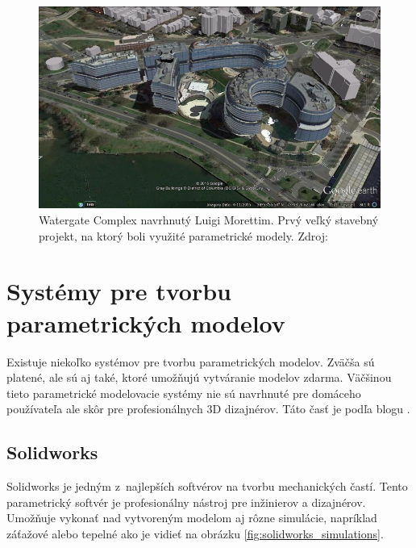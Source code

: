 \begin{figure}[H]
    \centering
    \includegraphics[width = \linewidth]{obrazky-figures/watergate-complex.jpg}
    \caption{Watergate Complex navrhnutý Luigi Morettim. Prvý veľký stavebný projekt, na ktorý boli využité parametrické modely. Zdroj: \cite{munger_2015}}
    \label{fig:Watergate}
\end{figure}





\section{Systémy pre tvorbu parametrických modelov}
Existuje niekoľko systémov pre tvorbu parametrických modelov. Zväčša sú platené, ale sú aj také, ktoré umožňujú vytváranie modelov zdarma. Väčšinou tieto parametrické modelovacie systémy nie sú navrhnuté pre domáceho používateľa ale skôr pre profesionálnych 3D dizajnérov. Táto časť je podľa blogu \cite{gaget_2018}.


\subsection*{Solidworks}
Solidworks je jedným z~najlepších softvérov na tvorbu mechanických častí. Tento parametrický softvér je profesionálny nástroj pre inžinierov a dizajnérov. Umožňuje vykonať nad vytvoreným modelom aj rôzne simulácie, napríklad záťažové alebo tepelné ako je vidieť na obrázku \ref{fig:solidworks_simulations}.




